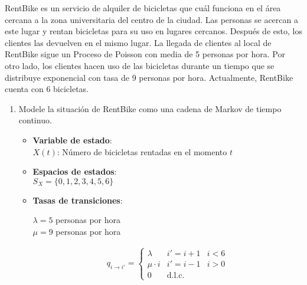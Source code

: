 
RentBike es un servicio de alquiler de bicicletas que cuál funciona en el área cercana a la zona universitaria del centro de la ciudad. Las personas se acercan a este lugar y rentan bicicletas para su uso en lugares cercanos. Después de esto, los clientes las devuelven en el mismo lugar. La llegada de clientes al local de RentBike sigue un Proceso de Poisson con media de 5 personas por hora. Por otro lado, los clientes hacen uso de las bicicletas durante un tiempo que se
distribuye exponencial con tasa de 9 personas por hora. Actualmente, RentBike cuenta con 6 bicicletas.


\begin{enumerate}
\item Modele la situación de RentBike como una cadena de Markov de tiempo continuo. \

    \begin{itemize}
    	\item[] \textbf{Variable de estado}:\\
    	$X(t)$: Número de bicicletas rentadas en el momento $t$
    		
    	\item[] \textbf{Espacios de estados}:\\
    	  $S_X = \{0,1,2,3,4,5,6\}$ 

    	\item[] \textbf{Tasas de transiciones}:\

            $\lambda = 5$ personas por hora \\
            $\mu = 9$ personas por hora 

            \begin{align*}
             q_{i \to i'} = \left\{ 
                \begin{array}{llll}
                    \lambda    &  i'=i+1 & i<6 \\ 
                    \mu \cdot i & i'=i-1  & i>0 \\ 
                    0 & \text{d.l.c.}
                \end{array} \right.
            \end{align*}

    
    \end{itemize}



\end{enumerate}

